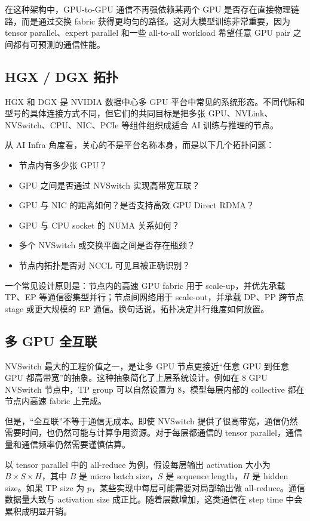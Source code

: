 在这种架构中，GPU-to-GPU 通信不再强依赖某两个 GPU 是否存在直接物理链路，而是通过交换 fabric 获得更均匀的路径。这对大模型训练非常重要，因为 tensor parallel、expert parallel 和一些 all-to-all workload 希望任意 GPU pair 之间都有可预测的通信性能。

\subsection{HGX / DGX 拓扑}
\label{subsec:hgx-dgx-topology}

HGX 和 DGX 是 NVIDIA 数据中心多 GPU 平台中常见的系统形态。不同代际和型号的具体连接方式不同，但它们的共同目标是把多张 GPU、NVLink、NVSwitch、CPU、NIC、PCIe 等组件组织成适合 AI 训练与推理的节点。

从 AI Infra 角度看，关心的不是平台名称本身，而是以下几个拓扑问题：

\begin{itemize}
  \item 节点内有多少张 GPU？
  \item GPU 之间是否通过 NVSwitch 实现高带宽互联？
  \item GPU 与 NIC 的距离如何？是否支持高效 GPU Direct RDMA？
  \item GPU 与 CPU socket 的 NUMA 关系如何？
  \item 多个 NVSwitch 或交换平面之间是否存在瓶颈？
  \item 节点内拓扑是否对 NCCL 可见且被正确识别？
\end{itemize}

一个常见设计原则是：节点内的高速 GPU fabric 用于 scale-up，并优先承载 TP、EP 等通信密集型并行；节点间网络用于 scale-out，并承载 DP、PP 跨节点 stage 或更大规模的 EP 通信。换句话说，拓扑决定并行维度如何放置。

\subsection{多 GPU 全互联}
\label{subsec:multi-gpu-full-connectivity}

NVSwitch 最大的工程价值之一，是让多 GPU 节点更接近“任意 GPU 到任意 GPU 都高带宽”的抽象。这种抽象简化了上层系统设计。例如在 8 GPU NVSwitch 节点中，TP group 可以自然设置为 8，模型每层内部的 collective 都在节点内高速 fabric 上完成。

但是，“全互联”不等于通信无成本。即使 NVSwitch 提供了很高带宽，通信仍然需要时间，也仍然可能与计算争用资源。对于每层都通信的 tensor parallel，通信量和通信频率仍然需要谨慎估算。

以 tensor parallel 中的 all-reduce 为例，假设每层输出 activation 大小为 $B \times S \times H$，其中 $B$ 是 micro batch size，$S$ 是 sequence length，$H$ 是 hidden size。如果 TP size 为 $p$，某些实现中每层可能需要对局部输出做 all-reduce。通信数据量大致与 activation size 成正比。随着层数增加，这类通信在 step time 中会累积成明显开销。

